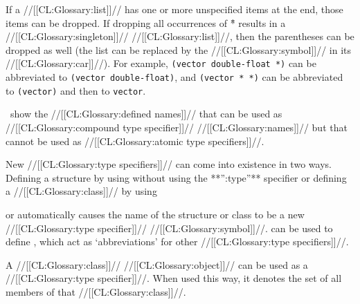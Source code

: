 If a //[[CL:Glossary:list]]// has one or more unspecified items at the end, 
those items can be dropped.
If dropping all occurrences of \f{*} results in a //[[CL:Glossary:singleton]]// //[[CL:Glossary:list]]//,
then the parentheses can be dropped as well (the list can be replaced
by the //[[CL:Glossary:symbol]]// in its //[[CL:Glossary:car]]//).  
For example,                       
{\tt (vector double-float *)}                    
can be abbreviated to {\tt (vector double-float)},               
and {\tt (vector * *)} can be abbreviated to {\tt (vector)} 
and then to 
{\tt vector}.





\Thenextfigure\ show the //[[CL:Glossary:defined names]]// that can be used as 
//[[CL:Glossary:compound type specifier]]// //[[CL:Glossary:names]]//
but that cannot be used as //[[CL:Glossary:atomic type specifiers]]//.




New //[[CL:Glossary:type specifiers]]// can come into existence in two ways.
\beginlist
\itemitem{\bull} 
 Defining a structure by using  without using
 the **'':type''** specifier or defining a //[[CL:Glossary:class]]// by using 

 or 
 automatically causes the name of the structure 
 or class to be a new //[[CL:Glossary:type specifier]]// //[[CL:Glossary:symbol]]//.
\itemitem{\bull} 
  can be used to define ,
 which act as `abbreviations' for other //[[CL:Glossary:type specifiers]]//.
\endlist

A //[[CL:Glossary:class]]// //[[CL:Glossary:object]]// can be used as a //[[CL:Glossary:type specifier]]//. 
When used this way, it denotes the set of all members of that //[[CL:Glossary:class]]//.

